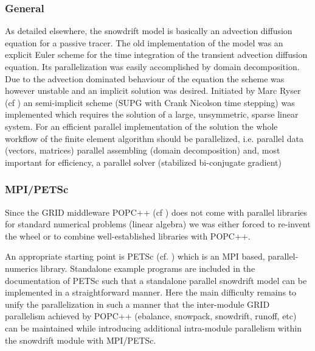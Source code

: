 \documentclass[12pt]{report}
\begin{document}
\subsubsection{General}

As detailed elsewhere, the snowdrift model is basically an advection
diffusion equation for a passive tracer. The old implementation of the
model was an explicit Euler scheme for the time integration of the
transient advection diffusion equation. Its parallelization was easily
accomplished by domain decomposition. Due to the advection dominated
behaviour of the equation the scheme was however unstable and an
implicit solution was desired. Initiated by Marc Ryser (cf
\cite{ryser_2004}) an semi-implicit scheme (SUPG with Crank Nicolson
time stepping) was implemented which requires the solution of a large,
unsymmetric, sparse linear system. For an efficient parallel
implementation of the solution the whole workflow of the finite
element algorithm should be parallelized, i.e. parallel data (vectors,
matrices) parallel assembling (domain decomposition) and, most
important for efficiency, a parallel solver (stabilized bi-conjugate
gradient)



\subsubsection{MPI/PETSc}
Since the GRID middleware POPC++ (cf \cite{popc}) does not come with
parallel libraries for standard numerical problems (linear algebra) we
was either forced to re-invent the wheel or to combine
well-established libraries with POPC++.

An appropriate starting point is PETSc (cf. \cite{petsc}) which is an
MPI based, parallel-numerics library. Standalone example programs are
included in the documentation of PETSc such that a standalone parallel
snowdrift model can be implemented in a straightforward manner. Here
the main difficulty remains to unify the parallelization in such a
manner that the inter-module GRID parallelism achieved by POPC++
(ebalance, snowpack, snowdrift, runoff, etc) can be maintained while
introducing additional intra-module parallelism within the snowdrift
module with MPI/PETSc.


\end{document}
